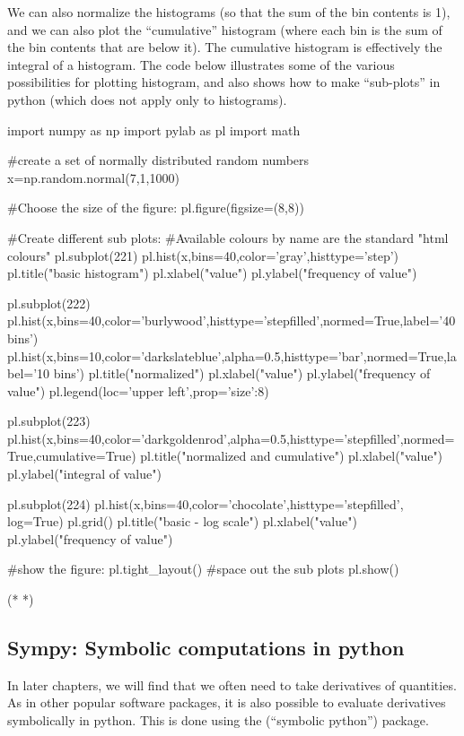 We can also normalize the histograms (so that the sum of the bin contents is 1), and we can also plot the ``cumulative'' histogram (where each bin is the sum of the bin contents that are below it). The cumulative histogram is effectively the integral of a histogram. The code below illustrates some of the various possibilities for plotting histogram, and also shows how to make ``sub-plots'' in python (which does not apply only to histograms).
\begin{python}[caption = Making a normalized histogram and making sub figures]
import numpy as np
import pylab as pl
import math 

#create a set of normally distributed random numbers
x=np.random.normal(7,1,1000)

#Choose the size of the figure:
pl.figure(figsize=(8,8))

#Create different sub plots:
#Available colours by name are the standard "html colours"
pl.subplot(221)
pl.hist(x,bins=40,color='gray',histtype='step')
pl.title("basic histogram")
pl.xlabel("value")
pl.ylabel("frequency of value")

pl.subplot(222)
pl.hist(x,bins=40,color='burlywood',histtype='stepfilled',normed=True,label='40 bins')
pl.hist(x,bins=10,color='darkslateblue',alpha=0.5,histtype='bar',normed=True,label='10 bins')
pl.title("normalized")
pl.xlabel("value")
pl.ylabel("frequency of value")
pl.legend(loc='upper left',prop={'size':8})

pl.subplot(223)
pl.hist(x,bins=40,color='darkgoldenrod',alpha=0.5,histtype='stepfilled',normed=True,cumulative=True)
pl.title("normalized and cumulative")
pl.xlabel("value")
pl.ylabel("integral of value")

pl.subplot(224)
pl.hist(x,bins=40,color='chocolate',histtype='stepfilled', log=True)
pl.grid()
pl.title("basic - log scale")
pl.xlabel("value")
pl.ylabel("frequency of value")

#show the figure:
pl.tight_layout() #space out the sub plots
pl.show()
\end{python}
\begin{poutput}
(*  *)
\end{poutput}

\subsection{Sympy: Symbolic computations in python}
In later chapters, we will find that we often need to take derivatives of quantities. As in other popular software packages, it is also possible to evaluate derivatives symbolically in python. This is done using the  (``symbolic python'') package. 

